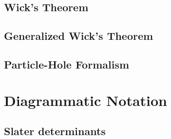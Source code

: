     \subsection{Wick's Theorem}

    \subsection{Generalized Wick's Theorem}

    \subsection{Particle-Hole Formalism}

\section{Diagrammatic Notation}
    \subsection{Slater determinants}
	
